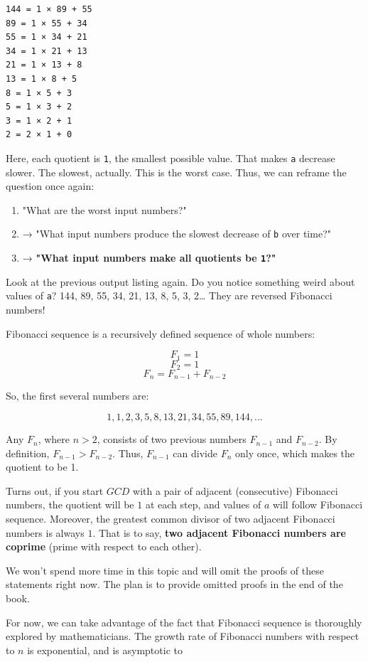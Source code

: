 \documentclass[a4paper, justified, notitlepage, sfsidenotes, notoc]{tufte-book}
\begin{document}
\begin{verbatim}
144 = 1 × 89 + 55
89 = 1 × 55 + 34
55 = 1 × 34 + 21
34 = 1 × 21 + 13
21 = 1 × 13 + 8
13 = 1 × 8 + 5
8 = 1 × 5 + 3
5 = 1 × 3 + 2
3 = 1 × 2 + 1
2 = 2 × 1 + 0
\end{verbatim}

Here, each quotient is \texttt{1}, the smallest possible value. That makes \texttt{a} decrease slower. The slowest, actually. This is the worst case. Thus, we can reframe the question once again:

\begin{enumerate}
\item "What are the worst input numbers?"
\item → "What input numbers produce the slowest decrease of \texttt{b} over time?"
\item → \textbf{"What input numbers make all quotients be \texttt{1}?"}
\end{enumerate}

Look at the previous output listing again. Do you notice something weird about values of \texttt{a}? 144, 89, 55, 34, 21, 13, 8, 5, 3, 2\ldots{} They are reversed Fibonacci numbers!

Fibonacci sequence is a recursively defined sequence of whole numbers:

$$F_{1} = 1$$
$$F_{2} = 1$$
$$F_{n} = F_{n-1} + F_{n-2}$$

So, the first several numbers are:

$$1, 1, 2, 3, 5, 8, 13, 21, 34, 55, 89, 144,...$$

Any \(F_{n}\), where \(n>2\), consists of two previous numbers \(F_{n-1}\) and \(F_{n-2}\). By definition, \(F_{n-1} > F_{n-2}\). Thus, \(F_{n-1}\) can divide \(F_{n}\) only once, which makes the quotient to be 1.

Turns out, if you start \(GCD\) with a pair of adjacent (consecutive) Fibonacci numbers, the quotient will be \(1\) at each step, and values of \(a\) will follow Fibonacci sequence. Moreover, the greatest common divisor of two adjacent Fibonacci numbers is always \(1\). That is to say, \textbf{\textbf{two adjacent Fibonacci numbers are coprime}} (prime with respect to each other).

We won't spend more time in this topic and will omit the proofs of these statements right now. The plan is to provide omitted proofs in the end of the book.

For now, we can take advantage of the fact that Fibonacci sequence is thoroughly explored by mathematicians. The growth rate of Fibonacci numbers with respect to \(n\) is exponential, and is asymptotic to
\end{document}
